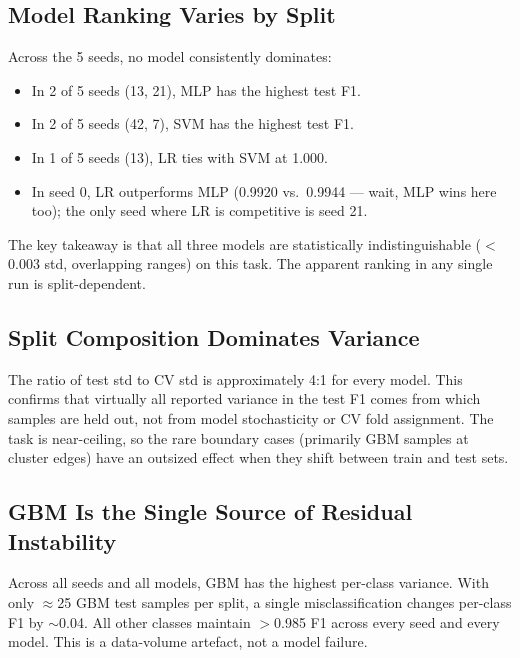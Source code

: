 \documentclass[11pt,letterpaper]{article}
\begin{document}
\subsection{Model Ranking Varies by Split}

Across the 5 seeds, no model consistently dominates:

\begin{itemize}[leftmargin=2em,itemsep=2pt]
  \item In 2 of 5 seeds (13, 21), MLP has the highest test F1.
  \item In 2 of 5 seeds (42, 7), SVM has the highest test F1.
  \item In 1 of 5 seeds (13), LR ties with SVM at 1.000.
  \item In seed 0, LR outperforms MLP (0.9920 vs.\ 0.9944 --- wait, MLP wins
        here too); the only seed where LR is competitive is seed 21.
\end{itemize}

The key takeaway is that all three models are statistically
indistinguishable ($<$0.003 std, overlapping ranges) on this task.
The apparent ranking in any single run is split-dependent.

\subsection{Split Composition Dominates Variance}

The ratio of test std to CV std is approximately 4:1 for every model.
This confirms that virtually all reported variance in the test F1 comes from
which samples are held out, not from model stochasticity or CV fold
assignment.  The task is near-ceiling, so the rare boundary cases (primarily
GBM samples at cluster edges) have an outsized effect when they shift
between train and test sets.

\subsection{GBM Is the Single Source of Residual Instability}

Across all seeds and all models, GBM has the highest per-class variance.
With only $\approx$25 GBM test samples per split, a single misclassification
changes per-class F1 by $\sim$0.04.  All other classes maintain $>$0.985
F1 across every seed and every model.  This is a data-volume artefact, not
a model failure.

\end{document}
